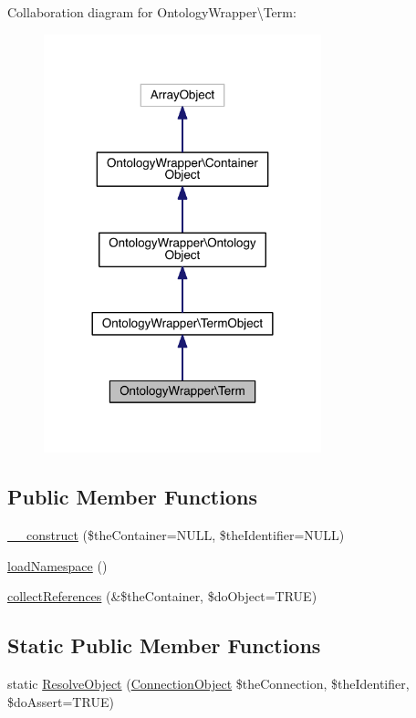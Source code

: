 Collaboration diagram for Ontology\-Wrapper\textbackslash{}Term\-:\nopagebreak
\begin{figure}[H]
\begin{center}
\leavevmode
\includegraphics[width=228pt]{class_ontology_wrapper_1_1_term__coll__graph}
\end{center}
\end{figure}
\subsection*{Public Member Functions}
\begin{DoxyCompactItemize}
\item 
\hyperlink{class_ontology_wrapper_1_1_term_af15064bcbdb083627b156deb9bce7aea}{\-\_\-\-\_\-construct} (\$the\-Container=N\-U\-L\-L, \$the\-Identifier=N\-U\-L\-L)
\item 
\hyperlink{class_ontology_wrapper_1_1_term_aff4bc870850271310f116c433999a3c5}{load\-Namespace} ()
\item 
\hyperlink{class_ontology_wrapper_1_1_term_a9247b063058e8cdbe94a8a774a70e70e}{collect\-References} (\&\$the\-Container, \$do\-Object=T\-R\-U\-E)
\end{DoxyCompactItemize}
\subsection*{Static Public Member Functions}
\begin{DoxyCompactItemize}
\item 
static \hyperlink{class_ontology_wrapper_1_1_term_a752e5172e2c51dcf9aaf24f49139ec80}{Resolve\-Object} (\hyperlink{class_ontology_wrapper_1_1_connection_object}{Connection\-Object} \$the\-Connection, \$the\-Identifier, \$do\-Assert=T\-R\-U\-E)
\end{DoxyCompactItemize}
